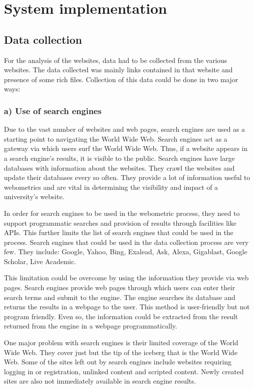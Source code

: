 \chapter{System implementation}
\section{Data collection}

\noindent
For the analysis of the websites, data had to be collected from the various websites. The data collected was mainly links contained in that website and presence of some rich files. Collection of this data could be done in two major ways:
\subsection{a) Use of search engines}

\noindent
Due to the vast number of websites and web pages, search engines are used as a starting point to navigating the World Wide Web. Search engines act as a gateway via which users surf the World
Wide Web. Thus, if a website appears in a search engine's results, it is visible to the public. Search engines have large databases with information about the websites. They crawl the websites and update their databases every so often. They provide a lot of information useful to webometrics and are vital in determining the visibility and impact of a university's website.

\noindent
In order for search engines to be used in the webometric process, they need to support programmatic searches and provision of results through facilities like APIs. This further limits the list of search engines that could be used in the process. Search engines that could be used in the data collection process are very few. They include: Google, Yahoo, Bing, Exalead, Ask, Alexa, Gigablast, Google Scholar, Live Academic.

\noindent
This limitation could be overcome by using the information they provide via web pages. Search engines provide web pages through which users can enter their search terms and submit to the engine. The engine searches its database and returns the results in a webpage to the user. This method is user-friendly but not program friendly. Even so, the information could be extracted from the result returned from the engine in a webpage programmatically.

\noindent
One major problem with search engines is their limited coverage of the World Wide Web. They cover just but the tip of the iceberg that is the World Wide Web. Some of the sites left out by search engines include websites requiring logging in or registration, unlinked  content and scripted content. Newly created sites are also not immediately available in search engine results.

